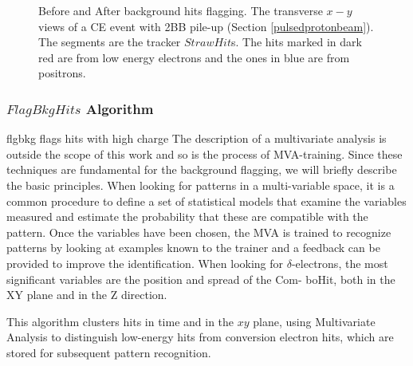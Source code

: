 \begin{figure}[!h]
\begin{subfigure}[b]{0.7\linewidth}
        \label{fig:af}
    \end{subfigure}
    \caption[Before and After background hits flagging.]{Before and After background hits flagging. 
    The transverse $x-y$ views of a CE event 
    with 2BB pile-up (Section \ref{pulsedprotonbeam}). The segments are the tracker $StrawHit$s. The hits marked in
    dark red are from low energy electrons and the ones in blue are from positrons.}
       \label{fig:befaf}
\end{figure}
\subsubsection{$FlagBkgHits$ Algorithm}
flgbkg flags hits with high charge
The description of a multivariate analysis is outside the scope of this work and so is the process
of MVA-training. Since these techniques are fundamental for the background flagging, we will briefly
describe the basic principles. When looking for patterns in a multi-variable space, it is a common
procedure to define a set of statistical models that examine the variables measured and estimate the
probability that these are compatible with the pattern. Once the variables have been chosen, the
MVA is trained to recognize patterns by looking at examples known to the trainer and a feedback can
be provided to improve the identification.
When looking for $\delta$-electrons, the most significant variables are the position and spread of the Com-
boHit, both in the XY plane and in the Z direction.

This algorithm 
clusters hits in time and in the $xy$ plane, using 
Multivariate Analysis to distinguish low-energy 
hits from conversion electron hits, which are 
stored for subsequent pattern recognition.
